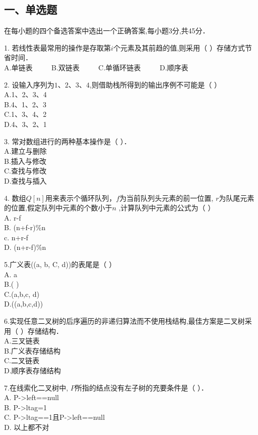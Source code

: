 
\subsection{一、单选题}
在每小题的四个备选答案中选出一个正确答案,每小题3分,共45分．

1. 若线性表最常用的操作是存取第$i$个元素及其前趋的值,则采用（  ）存储方式节省时间． \\
A.单链表 $\qquad$ B.双链表 $\qquad$ C.单循环链表 $\qquad$ D.顺序表

2. 设输入序列为$1$、$2$、$3$、$4$,则借助栈所得到的输出序例不可能是（  ） \\
A.1、2、3、4 \\
B.4、1、2、3 \\
C.1、3、4、2 \\
D.4、3、2、1

3. 常对数组进行的两种基本操作是（  ）． \\
A.建立与删除 \\
B.插入与修改 \\
C.查找与修改 \\
D.查找与插入

4. 数组$Q[n]$用来表示个循环队列，$f$为当前队列头元素的前一位置, $r$为队尾元素的位置,假定队列中元素的个数小于$n$ ,计算队列中元素的公式为（  ） \\
A. r-f \\
B. (n+f-r)\%n \\
c. n+r-f \\
D. (n+r-f)\%n

5.广义表((a, b, C, d))的表尾是（  ） \\
A. a \\
B.( ) \\
C.(a,b,c, d) \\
D.((a,b,c,d))

6.实现任意二叉树的后序遍历的非递归算法而不使用栈结构,最佳方案是二叉树采用（    ）存储结构． \\
A.三叉链表 \\
B.广义表存储结构 \\
C.二叉链表 \\
D.顺序表存储结构

7.在线索化二叉树中, $P$所指的结点没有左子树的充要条件是（    ）． \\
A. P->left==null \\
B. P->ltag=1 \\
C. P->ltag==1且P->left==null \\
D. 以上都不对


